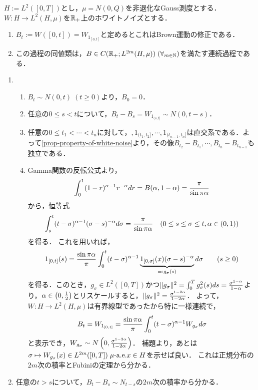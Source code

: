 \documentclass[uplatex,dvipdfmx]{jsreport}
\begin{document}
\begin{proposition}
    $H:=L^2([0,T])$とし，$\mu=N(0,Q)$を非退化なGauss測度とする．
    $W:H\to L^2(H,\mu)$を$\mathbb{R}_+$上のホワイトノイズとする．
    \begin{enumerate}
        \item $B_t:=W([0,t])=W_{1_{[0,t]}}$と定めるとこれはBrown運動の修正である．
        \item この過程の同値類は，$B\in C(\mathbb{R}_+;L^{2m}(H,\mu))\;(\forall_{m\in\mathbb{N}})$を満たす連続過程である．
    \end{enumerate}
\end{proposition}
\begin{Proof}\mbox{}
    \begin{enumerate}
        \item \begin{enumerate}[({B}1)]
            \item $B_t\sim N(0,t)\;(t\ge0)$より，$B_0=0$．
            \item 任意の$0\le s<t$について，$B_t-B_s=W_{1_{(s,t]}}\sim N(0,t-s)$．
            \item 任意の$0\le t_1<\cdots<t_n$に対して，$,1_{(t_1,t_2]},\cdots,1_{(t_{n-1},t_n]}$は直交系である．よって\ref{prop-property-of-white-noise}より，その像$B_{t_2}-B_{t_1},\cdots,B_{t_n}-B_{t_{n-1}}$も独立である．
            \item Gamma関数の反転公式より，
            \[\int^1_0(1-r)^{\alpha-1}r^{-\alpha}dr=B(\alpha,1-\alpha)=\frac{\pi}{\sin\pi\alpha}\]
            から，恒等式
            \[\int^t_s(t-\sigma)^{\alpha-1}(\sigma-s)^{-\alpha}d\sigma=\frac{\pi}{\sin\pi\alpha}\quad(0\le s\le\sigma\le t,\alpha\in(0,1))\]
            を得る．
            これを用いれば，
            \[1_{[0,t]}(s)=\frac{\sin\pi\alpha}{\pi}\int^t_0(t-\sigma)^{\alpha-1}\underbrace{1_{[0,\sigma]}(x)(\sigma-s)^{-\alpha}}_{=:g_\sigma(s)}d\sigma\qquad(s\ge0)\]
            を得る．このとき，$g_\sigma\in L^2([0,T])$かつ$\|g_\sigma\|^2=\int^T_0g_\sigma^2(s)ds=\frac{\sigma^{1-\alpha}}{1-\alpha}$より，$\alpha\in\left(0,\frac{1}{2}\right)$とリスケールすると，$\|g_\sigma\|^2=\frac{\sigma^{1-2\alpha}}{1-2\alpha}$．
            よって，$W:H\to L^2(H,\mu)$は有界線型であったから特に一様連続で，
            \[B_t=W_{1_{[0,t]}}=\frac{\sin\pi\alpha}{\pi}\int^t_0(t-\sigma)^{\alpha-1}W_{g_\sigma}d\sigma\]
            と表示でき，$W_{g_\sigma}\sim N\left(0,\frac{\sigma^{1-2\alpha}}{1-2\alpha}\right)$．
            補題より，あとは$\sigma\mapsto W_{g_\sigma}(x)\in L^{2m}([0,T])\;\mu\text{-a.e.} x\in H$を示せば良い．
            これは正規分布の$2m$次の積率とFubiniの定理から分かる．
        \end{enumerate}
        \item 任意の$t>s$について，$B_t-B_s\sim N_{t-s}$の$2m$次の積率から分かる．
    \end{enumerate}
\end{Proof}
\end{document}
